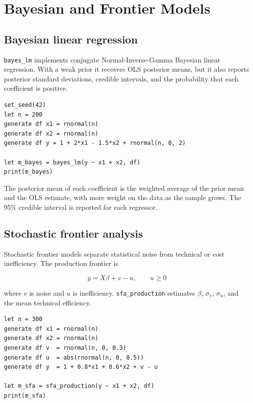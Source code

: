 \chapter{Bayesian and Frontier Models}

\section{Bayesian linear regression}

\texttt{bayes\_lm} implements conjugate Normal-Inverse-Gamma Bayesian linear
regression. With a weak prior it recovers OLS posterior means, but it
also reports posterior standard deviations, credible intervals, and the
probability that each coefficient is positive.

\begin{lstlisting}[caption={Bayesian linear regression}]
set_seed(42)
let n = 200
generate df x1 = rnormal(n)
generate df x2 = rnormal(n)
generate df y = 1 + 2*x1 - 1.5*x2 + rnormal(n, 0, 2)

let m_bayes = bayes_lm(y ~ x1 + x2, df)
print(m_bayes)
\end{lstlisting}

The posterior mean of each coefficient is the weighted average of the
prior mean and the OLS estimate, with more weight on the data as the
sample grows. The 95\% credible interval is reported for each
regressor.

\section{Stochastic frontier analysis}

Stochastic frontier models separate statistical noise from technical or
cost inefficiency. The production frontier is

\[
y = X\beta + v - u, \qquad u \ge 0
\]

where $v$ is noise and $u$ is inefficiency. \texttt{sfa\_production} estimates
$\beta$, $\sigma_v$, $\sigma_u$, and the mean technical efficiency.

\begin{lstlisting}[caption={Stochastic production frontier}]
let n = 300
generate df x1 = rnormal(n)
generate df x2 = rnormal(n)
generate df v  = rnormal(n, 0, 0.3)
generate df u  = abs(rnormal(n, 0, 0.5))
generate df y  = 1 + 0.8*x1 + 0.6*x2 + v - u

let m_sfa = sfa_production(y ~ x1 + x2, df)
print(m_sfa)
\end{lstlisting}

